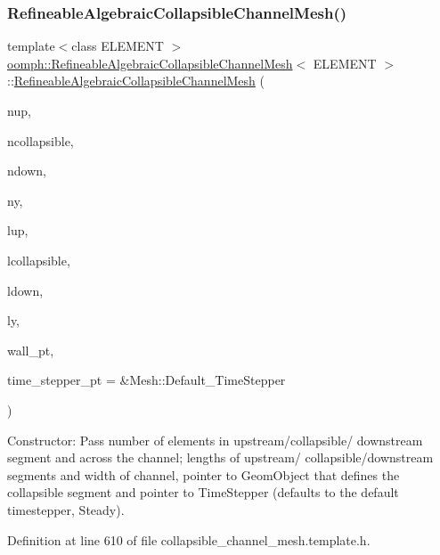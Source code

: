 \subsubsection{\texorpdfstring{Refineable\+Algebraic\+Collapsible\+Channel\+Mesh()}{RefineableAlgebraicCollapsibleChannelMesh()}\hspace{0.1cm}{\footnotesize\ttfamily [1/2]}}
{\footnotesize\ttfamily template$<$class E\+L\+E\+M\+E\+NT $>$ \\
\hyperlink{classoomph_1_1RefineableAlgebraicCollapsibleChannelMesh}{oomph\+::\+Refineable\+Algebraic\+Collapsible\+Channel\+Mesh}$<$ E\+L\+E\+M\+E\+NT $>$\+::\hyperlink{classoomph_1_1RefineableAlgebraicCollapsibleChannelMesh}{Refineable\+Algebraic\+Collapsible\+Channel\+Mesh} (\begin{DoxyParamCaption}\item[{const unsigned \&}]{nup,  }\item[{const unsigned \&}]{ncollapsible,  }\item[{const unsigned \&}]{ndown,  }\item[{const unsigned \&}]{ny,  }\item[{const double \&}]{lup,  }\item[{const double \&}]{lcollapsible,  }\item[{const double \&}]{ldown,  }\item[{const double \&}]{ly,  }\item[{Geom\+Object $\ast$}]{wall\+\_\+pt,  }\item[{Time\+Stepper $\ast$}]{time\+\_\+stepper\+\_\+pt = {\ttfamily \&Mesh\+:\+:Default\+\_\+TimeStepper} }\end{DoxyParamCaption})\hspace{0.3cm}{\ttfamily [inline]}}



Constructor\+: Pass number of elements in upstream/collapsible/ downstream segment and across the channel; lengths of upstream/ collapsible/downstream segments and width of channel, pointer to Geom\+Object that defines the collapsible segment and pointer to Time\+Stepper (defaults to the default timestepper, Steady). 



Definition at line 610 of file collapsible\+\_\+channel\+\_\+mesh.\+template.\+h.

\mbox{\label{classoomph_1_1RefineableAlgebraicCollapsibleChannelMesh_af36c924e3d8cc2a8659db4185d6612be}} 
